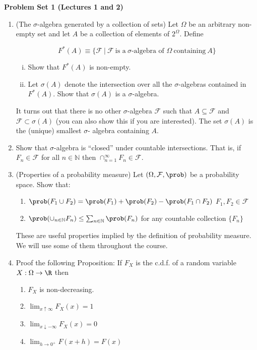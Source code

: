 \documentclass[11pt]{article} %
\begin{document}
\onehalfspace

\textbf{Problem Set 1 (Lectures 1 and 2)}

\begin{enumerate}
\item (The $\sigma$-algebra generated by a collection of sets) Let $\Omega$ be an arbitrary non-empty set and let $A$ be a collection of elements of $2^\Omega$.  Define 

$$F^*(A) \equiv \{\mathcal{F} \: | \: \mathcal{F} \: \text{is a} \: \sigma\text{-algebra of } \Omega \: \text{containing} \: A\} $$

\begin{enumerate}[i)]
\item Show that $F^*(A)$ is non-empty. 
\item Let $\sigma(A)$ denote the intersection over all the $\sigma$-algebras contained in $F^*(A)$. Show that $\sigma(A)$ is a $\sigma$-algebra.
\end{enumerate}

 It turns out that there is no other $\sigma$-algebra  $\mathcal{F}$ such that $A \subseteq \mathcal{F}$ and $\mathcal{F} \subset \sigma(A)$ (you can also show this if you are interested). The set $\sigma(A)$ is the (unique) smallest $\sigma$- algebra containing $A$.\\

\item Show that $\sigma$-algebra is ``closed'' under countable intersections. That is, if $F_n \in \mathcal{F}$ for all $n\in\mathbb{N}$ then $\cap_{n=1}^\infty F_n \in \mathcal{F}$.



\item (Properties of a probability measure) Let $(\Omega, \mathcal{F}, \prob)$ be a probability space. Show that:
\begin{enumerate}
\item $\prob(F_1 \cup F_2) = \prob(F_1) + \prob(F_2) - \prob(F_1 \cap F_2)$  $F_1,F_2 \in \mathcal{F}$
\item $\prob(\cup_{n \in \mathbb{N}} F_n) \leq \sum_{n \in \mathbb{N}} \prob(F_n) $ for any countable collection $\{F_n\}$
\end{enumerate}

 These are useful properties implied by the definition of probability measure. We will use some of them throughout the course. 

\item Proof the following Proposition: If $F_{X}$ is the c.d.f. of a random variable $X: \Omega \rightarrow \R$ then 
\begin{enumerate}
\item $F_{X}$ is non-decreasing.
\item $\lim_{x \uparrow \infty} F_{X}(x)=1$
\item $\lim_{x \downarrow -\infty} F_{X}(x)=0$
\item $\lim_{h \rightarrow 0^{+}} F(x+h)=F(x)$
\end{enumerate}


\end{enumerate}
\end{document}
